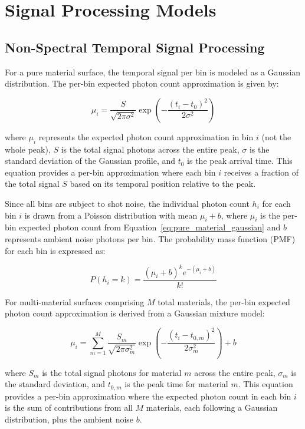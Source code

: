 \documentclass[11pt]{article}
\begin{document}
\section{Signal Processing Models}

\subsection{Non-Spectral Temporal Signal Processing}

For a pure material surface, the temporal signal per bin is modeled as a Gaussian distribution. The per-bin expected photon count approximation is given by:

\begin{equation}
\mu_i = \frac{S}{\sqrt{2\pi\sigma^2}} \exp\left(-\frac{(t_i - t_0)^2}{2\sigma^2}\right)
\label{eq:pure_material_gaussian}
\end{equation}

where $\mu_i$ represents the expected photon count approximation in bin $i$ (not the whole peak), $S$ is the total signal photons across the entire peak, $\sigma$ is the standard deviation of the Gaussian profile, and $t_0$ is the peak arrival time. This equation provides a per-bin approximation where each bin $i$ receives a fraction of the total signal $S$ based on its temporal position relative to the peak.

Since all bins are subject to shot noise, the individual photon count $h_i$ for each bin $i$ is drawn from a Poisson distribution with mean $\mu_i + b$, where $\mu_i$ is the per-bin expected photon count from Equation~\ref{eq:pure_material_gaussian} and $b$ represents ambient noise photons per bin. The probability mass function (PMF) for each bin is expressed as:

\begin{equation}
P(h_i = k) = \frac{(\mu_i + b)^k e^{-(\mu_i + b)}}{k!}
\label{eq:poisson_pmf}
\end{equation}

For multi-material surfaces comprising $M$ total materials, the per-bin expected photon count approximation is derived from a Gaussian mixture model:

\begin{equation}
\mu_i = \sum_{m=1}^{M} \frac{S_m}{\sqrt{2\pi\sigma_m^2}} \exp\left(-\frac{(t_i - t_{0,m})^2}{2\sigma_m^2}\right) + b
\label{eq:gaussian_mixture}
\end{equation}

where $S_m$ is the total signal photons for material $m$ across the entire peak, $\sigma_m$ is the standard deviation, and $t_{0,m}$ is the peak time for material $m$. This equation provides a per-bin approximation where the expected photon count in each bin $i$ is the sum of contributions from all $M$ materials, each following a Gaussian distribution, plus the ambient noise $b$.
\end{document}
